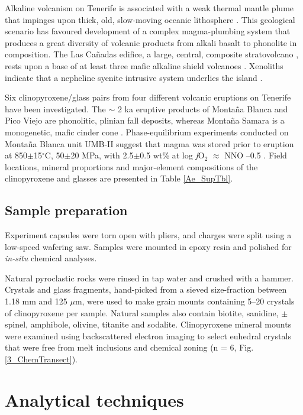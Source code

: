 \documentclass[final,authoryear,3p,times,twocolumn]{elsarticle}
\newcommand{\dgCs}{$^\circ$C}
\newcommand{\fO}{\textit{f}O$_{2}$ }
\begin{document}
Alkaline volcanism on Tenerife is associated with a weak thermal mantle plume that impinges upon thick, old, slow-moving oceanic lithosphere \citep{Carracedo2007}. This geological scenario has favoured development of a complex magma-plumbing system that produces a great diversity of volcanic products from alkali basalt to phonolite in composition. The Las Ca\~nadas edifice, a large, central, composite stratovolcano \citep{Bryan1998,Brown2003,Edgar2007}, rests upon a base of at least three mafic alkaline shield volcanoes \citep{Thirlwall2000,Guillou2004,Gurenko2006}. Xenoliths indicate that a nepheline syenite intrusive system underlies the island \citep{Wiesmaier2012}.

Six clinopyroxene/glass pairs from four different volcanic eruptions on Tenerife have been investigated. The $\sim$ 2 ka eruptive products of Monta\~na Blanca and Pico Viejo \citep{Ablay1995} are phonolitic, plinian fall deposits, whereas Monta\~na Samara is a monogenetic, mafic cinder cone \citep{Albert2015}. Phase-equilibrium experiments conducted on Monta\~na Blanca unit UMB-II suggest that magma was stored prior to eruption at 850$\pm$15\dgCs, 50$\pm$20 MPa, with 2.5$\pm$0.5 wt\%  at log \fO $\approx$ NNO --0.5  \citep{Andujar2012}. Field locations, mineral proportions and major-element compositions of the clinopyroxene and glasses are presented in Table \ref{Ae_SupTbl}.

\subsection{Sample preparation}
Experiment capsules were torn open with pliers, and charges were split using a low-speed wafering saw. Samples were mounted in epoxy resin and polished for \textit{in-situ} chemical analyses.

Natural pyroclastic rocks were rinsed in tap water and crushed with a hammer. Crystals and glass fragments, hand-picked from a sieved size-fraction between 1.18 mm and 125 $\mu$m, were used to make grain mounts containing 5--20 crystals of clinopyroxene per sample. Natural samples also contain biotite, sanidine, $\pm$ spinel, amphibole, olivine, titanite and sodalite. Clinopyroxene mineral mounts were examined using backscattered electron imaging to select euhedral crystals that were free from melt inclusions and chemical zoning (n = 6, Fig. \ref{3_ChemTransect}).


\section{Analytical techniques}
\end{document}
